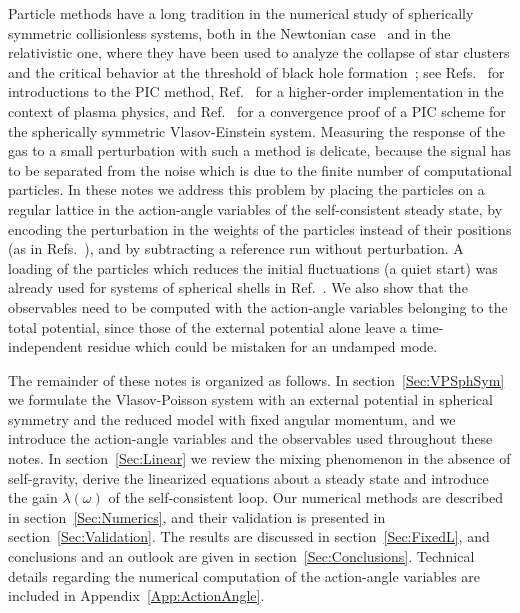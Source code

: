 Particle methods have a long tradition in the numerical study of spherically symmetric collisionless systems, both in the Newtonian case~\cite{tRgR18,cS24} and in the relativistic one, where they have been used to analyze the collapse of star clusters and the critical behavior at the threshold of black hole formation~\cite{sStT85,gRaRjS98,Olabarrieta:2000bn,Olabarrieta:2001wy,hAgR06}; see Refs.~\cite{BirdsallLangdon-Book,HockneyEastwood-Book,lapenta2015kinetic} for introductions to the PIC method, Ref.~\cite{Shalaby:2017yok} for a higher-order implementation in the context of plasma physics, and Ref.~\cite{gRtR03} for a convergence proof of a PIC scheme for the spherically symmetric Vlasov-Einstein system. Measuring the response of the gas to a small perturbation with such a method is delicate, because the signal has to be separated from the noise which is due to the finite number of computational particles. In these notes we address this problem by placing the particles on a regular lattice in the action-angle variables of the self-consistent steady state, by encoding the perturbation in the weights of the particles instead of their positions (as in Refs.~\cite{fLfCjB93,jBaOyY11}), and by subtracting a reference run without perturbation. A loading of the particles which reduces the initial fluctuations (a quiet start) was already used for systems of spherical shells in Ref.~\cite{mH73}. We also show that the observables need to be computed with the action-angle variables belonging to the total potential, since those of the external potential alone leave a time-independent residue which could be mistaken for an undamped mode.

The remainder of these notes is organized as follows. In section~\ref{Sec:VPSphSym} we formulate the Vlasov-Poisson system with an external potential in spherical symmetry and the reduced model with fixed angular momentum, and we introduce the action-angle variables and the observables used throughout these notes. In section~\ref{Sec:Linear} we review the mixing phenomenon in the absence of self-gravity, derive the linearized equations about a steady state and introduce the gain $\lambda(\omega)$ of the self-consistent loop. Our numerical methods are described in section~\ref{Sec:Numerics}, and their validation is presented in section~\ref{Sec:Validation}. The results are discussed in section~\ref{Sec:FixedL}, and conclusions and an outlook are given in section~\ref{Sec:Conclusions}. Technical details regarding the numerical computation of the action-angle variables are included in Appendix~\ref{App:ActionAngle}.